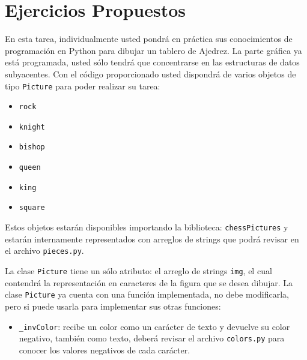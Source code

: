 \documentclass{article}
\begin{document}
\section{Ejercicios Propuestos}

En esta tarea, individualmente usted pondrá en práctica sus conocimientos de programación en Python para dibujar un tablero de Ajedrez. La parte gráfica ya está programada, usted sólo tendrá que concentrarse en las estructuras de datos subyacentes. Con el código proporcionado usted dispondrá de varios objetos de tipo \texttt{Picture} para poder realizar su tarea:

\begin{itemize}
    \item \texttt{rock}
    \item \texttt{knight}
    \item \texttt{bishop}
    \item \texttt{queen}
    \item \texttt{king}
    \item \texttt{square}
\end{itemize}

Estos objetos estarán disponibles importando la biblioteca: \texttt{chessPictures} y estarán internamente representados con arreglos de strings que podrá revisar en el archivo \texttt{pieces.py}.

La clase \texttt{Picture} tiene un sólo atributo: el arreglo de strings \texttt{img}, el cual contendrá la representación en caracteres de la figura que se desea dibujar. La clase \texttt{Picture} ya cuenta con una función implementada, no debe modificarla, pero si puede usarla para implementar sus otras funciones:
\begin{itemize}
    \item \texttt{\_invColor}: recibe un color como un carácter de texto y devuelve su color negativo, también como texto, deberá revisar el archivo \texttt{colors.py} para conocer los valores negativos de cada carácter.
\end{itemize}
\end{document}
